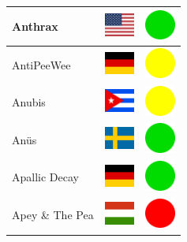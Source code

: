\documentclass[12pt, a4paper, twoside]{report}
\begin{document}
\begin{center}
\begin{longtable}{|p{5cm}|p{2cm}|p{2cm}|}
 Anthrax                                                    & \includegraphics[width=1cm]{../img/flags/us} &   \includegraphics[width=1cm]{../likes/y} \\ \hline
 AntiPeeWee                                                 & \includegraphics[width=1cm]{../img/flags/de} &   \includegraphics[width=1cm]{../likes/m} \\ \hline
 Anubis                                                     & \includegraphics[width=1cm]{../img/flags/cu} &   \includegraphics[width=1cm]{../likes/m} \\ \hline
 Anüs                                                       & \includegraphics[width=1cm]{../img/flags/se} &   \includegraphics[width=1cm]{../likes/y} \\ \hline
 Apallic Decay                                              & \includegraphics[width=1cm]{../img/flags/de} &   \includegraphics[width=1cm]{../likes/y} \\ \hline
 Apey \& The Pea                                            & \includegraphics[width=1cm]{../img/flags/hu} &   \includegraphics[width=1cm]{../likes/n} \\ \hline

\end{longtable}
\end{center}
\end{document}
